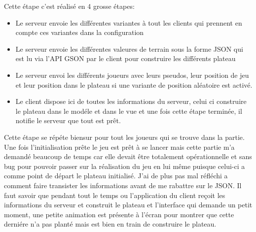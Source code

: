 \documentclass[12pt, openany]{report}
\begin{document}
Cette étape c'est réalisé en 4 grosse étapes:
	\begin{itemize}
	    \item Le serveur envoie les différentes variantes à tout les clients qui prennent en compte ces variantes dans la configuration
	    \item Le serveur envoie les différentes valeures de terrain sous la forme JSON qui est lu via l'API GSON par le client pour construire les différents plateau
	    \item Le serveur envoi les différents joueurs avec leurs pseudos, leur position de jeu et leur position dans le plateau si une variante de position aléatoire est activé.
	    \item Le client dispose ici de toutes les informations du serveur, celui ci construire le plateau dans le modéle et dans le vue et une fois cette étape terminée, il notifie le serveur que tout est prêt.
	\end{itemize}

Cette étape se répéte biensur pour tout les joueurs qui se trouve dans la partie.
Une fois l'initialisation prête le jeu est prêt à se lancer mais cette partie m'a demandé beaucoup de temps car elle devait être totalement opérationnelle et sans bug pour pouvoir passer sur la réalisation du jeu en lui même puisque celui-ci a comme point de départ le plateau initialisé. J'ai de plus pas mal réfléchi a comment faire transister les informations avant de me rabattre sur le JSON.
Il faut savoir que pendant tout le temps ou l'application du client reçoit les informations du serveur et construit le plateau et l'interface qui demande un petit moment, une petite animation est présente à l'écran pour montrer que cette derniére n'a pas planté mais est bien en train de construire le plateau.
\end{document}
